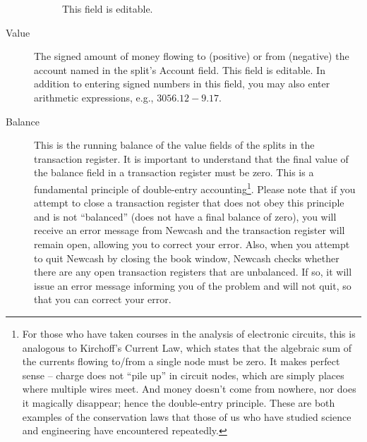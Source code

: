 \documentclass{report}
\begin{document}
\begin{description}
\begin{description}
This field is editable.
\end{description}
\item[Value] The signed amount of money flowing to (positive) or from (negative) the account named in the split's Account field. This field is editable. In addition to entering signed numbers in this field, you may also enter arithmetic expressions, e.g., $3056.12-9.17$.
\item[Balance] This is the running balance of the value fields of the splits in the transaction register. It is important to understand that the final value of the balance field in a transaction register must be zero. This is a fundamental principle of double-entry accounting\footnote{For those who have taken courses in the analysis of electronic circuits, this is analogous to Kirchoff's Current Law, which states that the algebraic sum of the currents flowing to/from a single node must be zero. It makes perfect sense -- charge does not ``pile up'' in circuit nodes, which are simply places where multiple wires meet. And money doesn't come from nowhere, nor does it magically disappear; hence the double-entry principle. These are both examples of the conservation laws that those of us who have studied science and engineering have encountered repeatedly.}. 
Please note that if you attempt to close a transaction register that does not obey this principle and is not ``balanced'' (does not have a final balance of zero), you will receive an error message from Newcash and the transaction register will remain open, allowing you to correct your error. Also, when you attempt to quit Newcash by closing the book window, Newcash checks whether there are any open transaction registers that are unbalanced. If so, it will issue an error message informing you of the problem and will not quit, so that you can correct your error.
\end{description}
\end{document}
